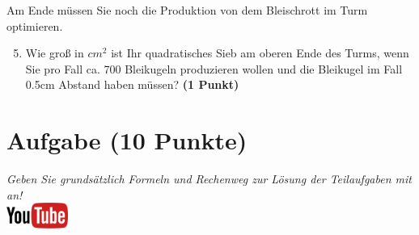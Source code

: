 \documentclass[a4paper, 10pt]{scrartcl}\usepackage[]{graphicx}\usepackage[]{xcolor}
\begin{document}
Am Ende m{\"u}ssen Sie noch die Produktion von dem Bleischrott im Turm optimieren.

\begin{enumerate}
  \setcounter{enumi}{4}
\item Wie gro{\ss} in $cm^2$ ist Ihr quadratisches Sieb am oberen Ende des Turms,
  wenn Sie pro Fall ca. 700 Bleikugeln produzieren wollen und
  die Bleikugel im Fall 0.5cm Abstand haben m{\"u}ssen?  \textbf{(1
    Punkt)}
\end{enumerate}

\clearpage\null
\clearpage\null 
\clearpage

\section{Aufgabe \hfill (10 Punkte)}

\textit{Geben Sie grunds{\"a}tzlich Formeln und Rechenweg zur L{\"o}sung der
  Teilaufgaben mit an!} \\[1Ex]

\hfill\href{https://youtu.be/paXxVmyfDPs}{\includegraphics[width =
  2cm]{img/youtube}} %
\hspace{2Ex}

\vspace{1Ex}
\end{document}
